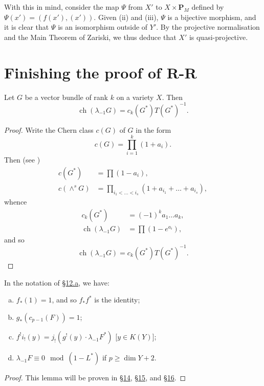 \documentclass{article}
\theoremstyle{plain}
\newenvironment{lemma}[1]
    {\renewcommand\theinnerlemma{#1}\innerlemma}
    {\endinnerlemma}
\theoremstyle{definition}
\newcommand{\PP}{\mathbf{P}}
\renewcommand{\geq}{\geqslant}
\DeclareMathOperator{\ch}{ch}
\begin{document}
With this in mind, consider the map $\Psi$ from $X'$ to $X\times\PP_M$ defined by $\Psi(x')=(f(x'),(x'))$.
Given (ii) and (iii), $\Psi$ is a bijective morphism, and it is clear that $\Psi$ is an isomorphism outside of $Y'$.
By the projective normalisation and the Main Theorem of Zariski, we thus deduce that $X'$ is quasi-projective.


\section{Finishing the proof of R-R}
\label{section13}

\begin{lemma}{18}
\label{lemma18}
  Let $G$ be a vector bundle of rank $k$ on a variety $X$.
  Then
  \[
    \ch(\lambda_{-1}G) = c_k(G^*)T(G^*)^{-1}.
  \]
\end{lemma}

\begin{proof}
  Write the Chern class $c(G)$ of $G$ in the form
  \[
    c(G) = \prod_{i=1}^k (1+a_i).
  \]
  Then (see \cite{9})
  \begin{align*}
    c(G^*) &= \prod (1-a_i),
  \\c(\wedge^sG) &= \prod_{i_1<\ldots<i_s} (1+a_{i_1}+\ldots+a_{i_s}),
  \end{align*}
  whence
  \begin{align*}
    c_k(G^*) &= (-1)^k a_1\ldots a_k,
  \\\ch(\lambda_{-1}G) &= \prod (1-e^{a_i}),
  \end{align*}
  and so
  \[
    \ch(\lambda_{-1}G) = c_k(G^*)T(G^*)^{-1}.
  \]
\end{proof}

\begin{lemma}{19}
\label{lemma19}
  In the notation of \hyperref[section12a]{\S12.a}, we have:
  \begin{enumerate}[(a)]
    \item $f_*(1) = 1$, and so $f_*f^*$ is the identity;
    \item $g_*(c_{p-1}(F)) = 1$;
    \item $f^!i_!(y) = j_!(g^!(y)\cdot\lambda_{-1}F^*)$ [$y\in K(Y)$];
    \item $\lambda_{-1}F\equiv0 \mod(1-L^*)$ if $p\geq\dim Y+2$.
  \end{enumerate}
\end{lemma}

\begin{proof}
  This lemma will be proven in \hyperref[section14]{\S14}, \hyperref[section15]{\S15}, and \hyperref[section16]{\S16}.
\end{proof}
\end{document}
